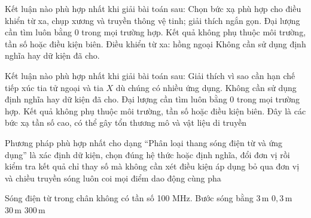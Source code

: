 \begin{ex}
Kết luận nào phù hợp nhất khi giải bài toán sau: Chọn bức xạ phù hợp cho điều khiển từ xa, chụp xương và truyền thông vệ tinh; giải thích ngắn gọn.
\choice
{Đại lượng cần tìm luôn bằng 0 trong mọi trường hợp.}
{Kết quả không phụ thuộc môi trường, tần số hoặc điều kiện biên.}
{\True Điều khiển từ xa: hồng ngoại}
{Không cần sử dụng định nghĩa hay dữ kiện đã cho.}
\end{ex}

\begin{ex}
Kết luận nào phù hợp nhất khi giải bài toán sau: Giải thích vì sao cần hạn chế tiếp xúc tia tử ngoại và tia $X$ dù chúng có nhiều ứng dụng.
\choice
{Không cần sử dụng định nghĩa hay dữ kiện đã cho.}
{Đại lượng cần tìm luôn bằng 0 trong mọi trường hợp.}
{Kết quả không phụ thuộc môi trường, tần số hoặc điều kiện biên.}
{\True Đây là các bức xạ tần số cao, có thể gây tổn thương mô và vật liệu di truyền}
\end{ex}

\begin{ex}
Phương pháp phù hợp nhất cho dạng “Phân loại thang sóng điện từ và ứng dụng” là
\choice
{\True xác định dữ kiện, chọn đúng hệ thức hoặc định nghĩa, đổi đơn vị rồi kiểm tra kết quả}
{chỉ thay số mà không cần xét điều kiện áp dụng}
{bỏ qua đơn vị và chiều truyền sóng}
{luôn coi mọi điểm dao động cùng pha}
\end{ex}

\begin{ex}
Sóng điện từ trong chân không có tần số 100 MHz. Bước sóng bằng
\choice
{\True $3\,\text{m}$}
{$0,3\,\text{m}$}
{$30\,\text{m}$}
{$300\,\text{m}$}
\end{ex}

